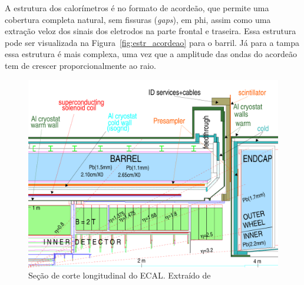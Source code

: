 A estrutura dos calorímetros é no formato de acordeão, que permite uma cobertura
completa natural, sem fissuras (\emph{gaps}), em \gls{phi}, assim como uma extração veloz dos sinais dos eletrodos 
na parte frontal e traseira. Essa estrutura pode ser visualizada na Figura~\ref{fig:estr_acordeao}
para o barril. Já para a tampa essa estrutura é mais complexa, uma
vez que a amplitude das ondas do acordeão tem de crescer proporcionalmente ao
raio. 

\begin{figure}[h!t]
\centering
\includegraphics[width=1\textwidth]{figures/calorimetros_secao.pdf}
\caption[Seção de corte longitudinal do ECAL]
{Seção de corte longitudinal do ECAL. Extraído de
\cite{cal_tdr}}
\label{fig:secao_em_calo}
\end{figure}


